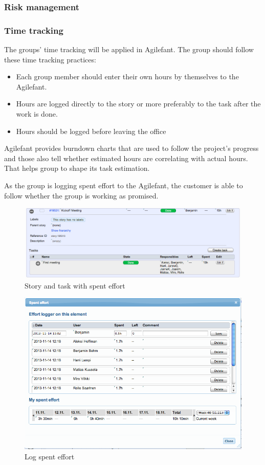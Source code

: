 \subsubsection{Risk management}

\subsubsection{Time tracking}

The groups' time tracking will be applied in Agilefant. The group should follow these time tracking practices:
\begin{itemize}
\item Each group member should enter their own hours by themselves to the Agilefant.
\item Hours are logged directly to the story or more preferably to the task after the work is done. 
\item Hours should be logged before leaving the office
\end{itemize}

Agilefant provides burndown charts that are used to follow the project's progress and those also tell whether estimated hours are correlating with actual hours. That helps group to shape its task estimation.

As the group is logging spent effort to the Agilefant, the customer is able to follow whether the group is working as promised. 

\begin{figure}[H]
\centering
\includegraphics[width=1\textwidth]{imgs/spenteffort1.png}
\caption{Story and task with spent effort}
\label{fig:spenteffort1}
\end{figure}


\begin{figure}[H]
\centering
\includegraphics[width=1\textwidth]{imgs/spenteffort2.png}
\caption{Log spent effort}
\label{fig:spenteffort2}
\end{figure}

